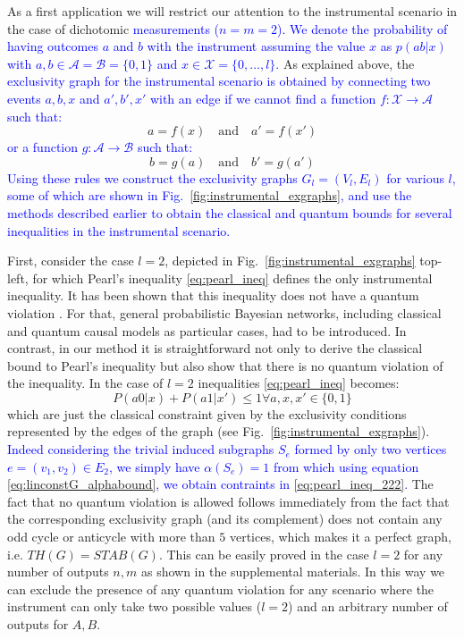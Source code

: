 \documentclass[letterpaper]{article}
\begin{document}
As a first application we will restrict our attention to the instrumental
scenario in the case of dichotomic \textcolor{blue}{measurements ($n = m = 2$).
We denote the probability of having outcomes $a$ and $b$ with the
instrument assuming the value $x$ as $p(ab|x)$ with $a, b \in \mathcal{A}
= \mathcal{B} = \{0,1\}$ and $x \in \mathcal{X} = \{0,\ldots,l\}$.}
As explained above, the 
\textcolor{blue}{exclusivity graph for the instrumental scenario is obtained by
connecting two events $a,b,x$ and $a',b',x'$ with an edge if we cannot find a function
$f:\mathcal{X} \rightarrow \mathcal{A}$ such that:
}
\begin{equation}
    a = f(x) \quad\text{and}\quad a'=f(x')
\end{equation}
\textcolor{blue}{
or a function $g:\mathcal{A} \rightarrow \mathcal{B}$ such that:
}
\begin{equation}
     b = g(a) \quad\text{and}\quad b'=g(a')
    \label{eq:non_exclusivity_condition}
\end{equation}
\textcolor{blue}{Using these rules we construct the exclusivity
graphs $G_l = (V_l, E_l)$ for various $l$, some of which are shown in
Fig.~\ref{fig:instrumental_exgraphs}, and use the methods described
earlier to obtain the classical and quantum bounds for several
inequalities in the instrumental scenario.
}

First, consider the case $l=2$, depicted in
Fig.~\ref{fig:instrumental_exgraphs} top-left, for which Pearl's
inequality \eqref{eq:pearl_ineq} defines the only instrumental inequality.
It has been shown that this inequality does not have a quantum violation
\cite{henson2014}.
For that, general probabilistic Bayesian networks, including classical and
quantum causal models as particular cases, had to be introduced.
In contrast, in our method it is straightforward not only to derive the
classical bound to Pearl's inequality but also show that there is no quantum
violation of the inequality.
In the case of $l=2$ inequalities \eqref{eq:pearl_ineq} becomes:
\begin{equation}
    P(a0|x) + P(a1|x') \le 1 \forall a,x,x' \in \{0,1\} 
    \label{eq:pearl_ineq_222}
\end{equation}
which are just the classical constraint given by the exclusivity conditions
represented by the edges of the graph (see Fig.~\ref{fig:instrumental_exgraphs}).
\textcolor{blue}{
Indeed considering the trivial induced subgraphs $S_e$ formed by only two vertices
$e = (v_1, v_2) \in E_2$, we simply have $\alpha(S_e) = 1$ from which using equation
\eqref{eq:linconstG_alphabound}, we obtain contraints in \eqref{eq:pearl_ineq_222}.
}
The fact that no quantum violation is allowed follows immediately from the fact
that the corresponding  exclusivity graph (and its complement) does not contain
any odd cycle or anticycle with more than $5$ vertices, which makes it a perfect
graph, i.e. $TH(G) = STAB(G)$. This can be easily proved in the case $l=2$ for any number of
outputs $n,m$ as shown in the supplemental materials. In this way we can exclude the
presence of any quantum violation for any scenario where the instrument can only
take two possible values ($l=2$) and an arbitrary number of outputs for $A, B$.
\end{document}
